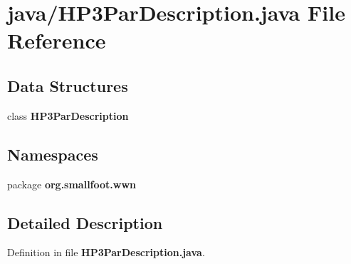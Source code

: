 \section{java/\-H\-P3\-Par\-Description.java \-File \-Reference}
\label{HP3ParDescription_8java}
\subsection*{\-Data \-Structures}
\begin{DoxyCompactItemize}
\item 
class {\bf \-H\-P3\-Par\-Description}
\end{DoxyCompactItemize}
\subsection*{\-Namespaces}
\begin{DoxyCompactItemize}
\item 
package {\bf org.\-smallfoot.\-wwn}
\end{DoxyCompactItemize}


\subsection{\-Detailed \-Description}


\-Definition in file {\bf \-H\-P3\-Par\-Description.\-java}.

